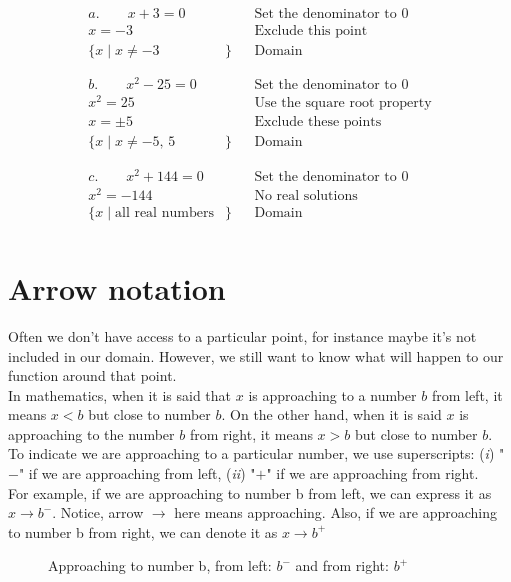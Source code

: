 \begin{align*}
a.\qquad x+3 =0&    &   &\text{Set the denominator to 0}\\
     x = -3&        &   &\text{Exclude this point}\\
     \{x \mid x\neq-3&\}    &   &\text{Domain} \\
    & &&\\
    & &&\\
b.\qquad x^2-25 =0&   &   &\text{Set the denominator to 0}\\
     x^2 = 25&        &   &\text{Use the square root property}\\
     x = \pm 5&         &   &\text{Exclude these points} \\
     \{x \mid x\neq-5,\,5&\}    &   &\text{Domain} \\
    & &&\\
    & &&\\
c.\qquad x^2+144 =0&   &   &\text{Set the denominator to 0}\\
     x^2 = -144&        &   &\text{No real solutions}\\
     \{x \mid \text{all real numbers}&\} &   &\text{Domain} \\
\end{align*}
\section{Arrow notation}
Often we don't have access to a particular point, for instance maybe it's not included in our domain. However, we still want to know what will happen to our function around that point.\\
In mathematics, when it is said that $x$ is approaching to a number $b$ from left, it means $x<b$ but close to number $b$. On the other hand, when it is said $x$ is approaching to the number $b$ from right, it means $x>b$ but close to number $b$.\\
To indicate we are approaching to a particular number, we use superscripts: (\textit{i}) "$-$" if we are approaching from left, (\textit{ii}) "$+$" if we are approaching from right. \\
For example, if we are approaching to number b from left, we can express it as $x \rightarrow b^-$. Notice, arrow $\rightarrow$ here means approaching. Also, if we are approaching to number b from right, we can denote it as $x \rightarrow b^+$
\begin{figure}[ht]
  \centering
  \caption{Approaching to number b, from left: $b^-$ and from right: $b^+$}
\end{figure}


